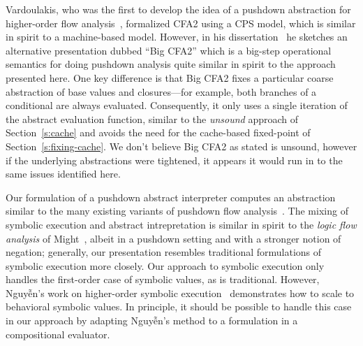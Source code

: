 Vardoulakis, who was the first to develop the idea of a pushdown abstraction
for higher-order flow analysis~\cite{dvanhorn:Vardoulakis2011CFA2}, formalized
CFA2 using a CPS model, which is similar in spirit to a machine-based model.
However, in his dissertation~\cite{local:vardoulakis-diss12} he sketches an
alternative presentation dubbed ``Big CFA2'' which is a big-step operational
semantics for doing pushdown analysis quite similar in spirit to the approach
presented here.  One key difference is that Big CFA2 fixes a particular coarse
abstraction of base values and closures---for example, both branches of a
conditional are always evaluated.  Consequently, it only uses a single
iteration of the abstract evaluation function, similar to the \emph{unsound}
approach of Section~\ref{s:cache} and avoids the need for the cache-based
fixed-point of Section~\ref{s:fixing-cache}.  We don't believe Big CFA2 as
stated is unsound, however if the underlying abstractions were tightened, it
appears it would run in to the same issues identified here.

Our formulation of a pushdown abstract interpreter computes an abstraction
similar to the many existing variants of pushdown flow analysis~\cite%
{dvanhorn:Vardoulakis2011CFA2%
,dvanhorn:Earl2010Pushdown%
,local:vardoulakis-diss12%
,dvanhorn:VanHorn2012Systematic%
,dvanhorn:Earl2012Introspective%
,dvanhorn:Johnson2014Abstracting%
,dvanhorn:Johnson2014Pushdown%
,local:p4f%
}.
The mixing of symbolic execution and abstract intrepretation is similar in
spirit to the \emph{logic flow analysis} of Might~\cite{local:might-popl07},
albeit in a pushdown setting and with a stronger notion of negation; generally,
our presentation resembles traditional formulations of symbolic execution more
closely.  Our approach to symbolic execution only handles the first-order case
of symbolic values, as is traditional.  However, Nguyễn's work on higher-order
symbolic execution~\cite{dvanhorn:Nguyen2015Relatively} demonstrates how to
scale to behavioral symbolic values.  In principle, it should be possible to
handle this case in our approach by adapting Nguyễn's method to a formulation
in a compositional evaluator.

